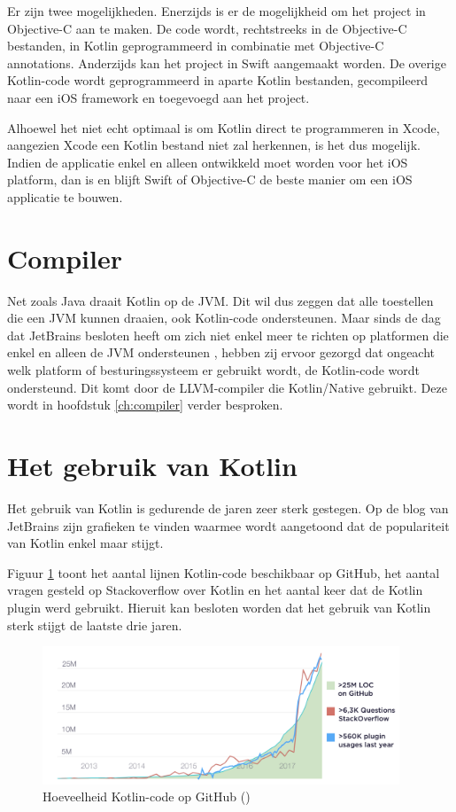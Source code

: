 Er zijn twee mogelijkheden. Enerzijds is er de mogelijkheid om het project in Objective-C aan te maken. De code wordt, rechtstreeks in de Objective-C bestanden, in Kotlin geprogrammeerd in combinatie met Objective-C annotations. Anderzijds kan het project in Swift aangemaakt worden. De overige Kotlin-code wordt geprogrammeerd in aparte Kotlin bestanden, gecompileerd naar een iOS framework en toegevoegd aan het project.

Alhoewel het niet echt optimaal is om Kotlin direct te programmeren in Xcode, aangezien Xcode een Kotlin bestand niet zal herkennen, is het dus mogelijk. Indien de applicatie enkel en alleen ontwikkeld moet worden voor het iOS platform, dan is en blijft Swift of Objective-C de beste manier om een iOS applicatie te bouwen.

\section{Compiler}
\label{sec:llvm}
Net zoals Java draait Kotlin op de JVM. Dit wil dus zeggen dat alle toestellen die een JVM kunnen draaien, ook Kotlin-code ondersteunen. Maar sinds de dag dat JetBrains besloten heeft om zich niet enkel meer te richten op platformen die enkel en alleen de JVM ondersteunen \autocite{JetBrainsVM}, hebben zij ervoor gezorgd dat ongeacht welk platform of besturingssysteem er gebruikt wordt, de Kotlin-code wordt ondersteund. Dit komt door de LLVM-compiler die Kotlin/Native gebruikt. Deze wordt in hoofdstuk \ref{ch:compiler} verder besproken.

\section{Het gebruik van Kotlin}
\label{sec:kotlingebruik}
Het gebruik van Kotlin is gedurende de jaren zeer sterk gestegen. Op de blog van JetBrains \autocite{JetBrains12} zijn grafieken te vinden waarmee wordt aangetoond dat de populariteit van Kotlin enkel maar stijgt.

Figuur \ref{fig:kotlingithub} toont het aantal lijnen Kotlin-code beschikbaar op GitHub, het aantal vragen gesteld op Stackoverflow over Kotlin en het aantal keer dat de Kotlin plugin werd gebruikt. Hieruit kan besloten worden dat het gebruik van Kotlin sterk stijgt de laatste drie jaren.

\begin{figure} [ht]
	\centering
	\includegraphics[width=0.95\textwidth]{img/KotlinAdoption.png}
	\caption{Hoeveelheid Kotlin-code op GitHub (\cite{JetBrains12})}
	\label{fig:kotlingithub}
\end{figure}

